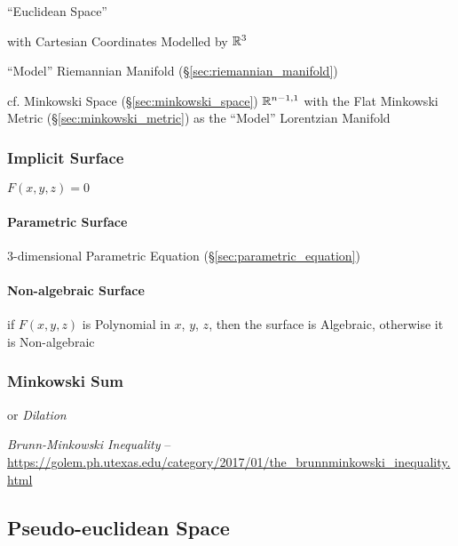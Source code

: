 ``Euclidean Space''

with Cartesian Coordinates Modelled by $\mathbb{R}^3$

``Model'' Riemannian Manifold (\S\ref{sec:riemannian_manifold})

cf. Minkowski Space (\S\ref{sec:minkowski_space}) $\mathbb{R}^{n-1,1}$
with the Flat Minkowski Metric (\S\ref{sec:minkowski_metric}) as the
``Model'' Lorentzian Manifold



\subsubsection{Implicit Surface}\label{sec:implicit_surface}

$F(x,y,z) = 0$



\paragraph{Parametric Surface}\label{sec:parametric_surface}\hfill

3-dimensional Parametric Equation (\S\ref{sec:parametric_equation})



\paragraph{Non-algebraic Surface}\label{sec:nonalgebraic_surface}\hfill

if $F(x,y,z)$ is Polynomial in $x$, $y$, $z$, then the surface is
Algebraic, otherwise it is Non-algebraic



\subsubsection{Minkowski Sum}\label{sec:minkowski_sum}

or \emph{Dilation}

\emph{Brunn-Minkowski Inequality} --
\url{https://golem.ph.utexas.edu/category/2017/01/the_brunnminkowski_inequality.html}



\subsection{Pseudo-euclidean Space}\label{sec:pseudo_euclidean}

